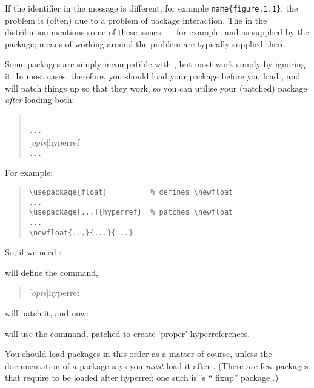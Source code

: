 {If the identifier in the message is different, for example
\texttt{name\{figure.1.1\}}, the problem is (often) due to a problem of
package interaction.  The  in the 
distribution mentions some of these issues~--- for example,
 and  as supplied by the
 package; means of working around the problem are
typically supplied there.

Some packages are simply incompatible with
, but most work simply by ignoring it.  In most
cases, therefore, you should load your package before you load
, and  will patch things up so
that they work, so you can utilise your (patched) package \emph{after}
loading both:
\begin{quote}
  \\
  \texttt{...}\\
  [\emph{opts}]{hyperref}\\
  \texttt{...}\\
\end{quote}
\begin{wideversion}
For example:
\begin{quote}
\begin{verbatim}
\usepackage{float}          % defines \newfloat
...
\usepackage[...]{hyperref}  % patches \newfloat
...
\newfloat{...}{...}{...}
\end{verbatim}
\end{quote}
\end{wideversion}
\begin{narrowversion}
So, if we need :
\begin{quote}
\end{quote}
will define the command,
\begin{quote}
[\emph{opts}]{hyperref}
\end{quote}
will patch it, and now: 
\begin{quote}
\end{quote}
will use the command, patched to create `proper' hyperreferences.
\end{narrowversion}
You should load packages in this order as a matter of course, unless
the documentation of a package says you \emph{must} load it after
.  (There are few packages that require to be
loaded after hyperref: one such is 's
`` fixup'' package .)

}
